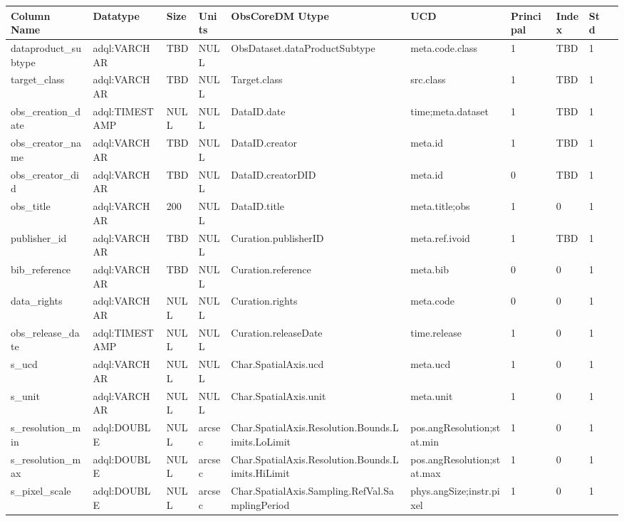 \documentclass[11pt,a4paper]{ivoa}
\begin{document}
\begin{tabular}{|l|p{}|p{}|p{}|p{}|
  p{}|p{}|p{}|p{}|p{}|}
\hline
Column Name & Datatype & Size & Units & ObsCoreDM Utype & UCD & Principal & Index & Std\\\hline
dataproduct\_subtype &
adql:VARCHAR &
TBD &
NULL &
ObsDataset.dataProductSubtype &
meta.code.class &
1 &
TBD &
1\\\hline
target\_class &
adql:VARCHAR &
TBD &
NULL &
Target.class &
src.class &
1 &
TBD &
1\\\hline
obs\_creation\_date &
adql:TIMESTAMP &
NULL &
NULL &
DataID.date &
time;meta.dataset &
1 &
TBD &
1\\\hline
obs\_creator\_name   &
adql:VARCHAR &
TBD &
NULL &
DataID.creator &
meta.id &
1 &
TBD &
1\\\hline
obs\_creator\_did &
adql:VARCHAR &
TBD &
NULL &
DataID.creatorDID &
meta.id &
0 &
TBD &
1\\\hline
obs\_title &
adql:VARCHAR &
200 &
NULL &
DataID.title &
meta.title;obs &
1 &
0 &
1\\\hline
publisher\_id   &
adql:VARCHAR &
TBD &
NULL &
Curation.publisherID &
meta.ref.ivoid &
1 &
TBD &
1\\\hline
bib\_reference   &
adql:VARCHAR &
TBD &
NULL &
Curation.reference &
meta.bib &
0 &
0 &
1\\\hline
data\_rights   &
adql:VARCHAR &
NULL &
 NULL &
Curation.rights &
meta.code &
0 &
0 &
1\\\hline
obs\_release\_date &
adql:TIMESTAMP &
NULL &
NULL &
Curation.releaseDate &
time.release &
1 &
0 &
1\\\hline
s\_ucd   &
adql:VARCHAR &
NULL &
NULL &
Char.SpatialAxis.ucd &
meta.ucd &
1 &
0 &
1\\\hline
s\_unit   &
adql:VARCHAR &
NULL &
NULL &
Char.SpatialAxis.unit &
meta.unit &
1 &
0 &
1\\\hline
s\_resolution\_min &
adql:DOUBLE &
NULL &
arcsec &
Char.SpatialAxis.Resolution.Bounds.Limits.LoLimit &
pos.angResolution;stat.min &
1 &
0 &
1\\\hline
s\_resolution\_max &
adql:DOUBLE &
NULL &
arcsec &
Char.SpatialAxis.Resolution.Bounds.Limits.HiLimit &
pos.angResolution;stat.max &
1 &
0 &
1\\\hline
s\_pixel\_scale &
adql:DOUBLE &
NULL &
arcsec &
Char.SpatialAxis.Sampling.RefVal.SamplingPeriod &
phys.angSize;instr.pixel &
1 &
0 &
1\\\hline

\end{tabular}
\end{document}
